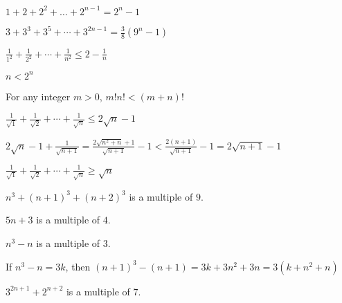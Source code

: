 \begin{multicols}{2}
\begin{ex}
$1 + 2 + 2^{2} + \dots  + 2^{n-1} = 2^{n} - 1$
\end{ex}

\begin{ex}
$3 + 3^3 + 3^5 + \cdots + 3^{2n-1} = \frac{3}{8} (9^n-1)$
\end{ex}

\begin{ex}
$\frac{1}{1^2} + \frac{1}{2^2} + \cdots + \frac{1}{n^2} \leq 2 - \frac{1}{n}$
\end{ex}

\begin{ex}
$n < 2^{n}$
\end{ex}

\begin{ex}
For any integer $m > 0$, $m!n! < (m + n)!$
\end{ex}

\begin{ex}
$\frac{1}{\sqrt{1}} + \frac{1}{\sqrt{2}} + \cdots + \frac{1}{\sqrt{n}} \leq 2\sqrt{n}-1$


\begin{sol}
$2\sqrt{n} - 1 + \frac{1}{\sqrt{n+1}} = \frac{2\sqrt{n^2+n}+1}{\sqrt{n+1}} - 1 < \frac{2(n+1)}{\sqrt{n+1}}-1 = 2\sqrt{n+1}-1$
\end{sol}
\end{ex}

\begin{ex}
$\frac{1}{\sqrt{1}} + \frac{1}{\sqrt{2}} + \cdots + \frac{1}{\sqrt{n}} \geq \sqrt{n}$
\end{ex}

\begin{ex}
$n^{3} + (n + 1)^{3} + (n + 2)^{3}$ is a multiple of $9$.
\end{ex}

\begin{ex}
$5n + 3$ is a multiple of $4$.
\end{ex}

\begin{ex}
$n^{3} - n$ is a multiple of $3$.

\begin{sol}
If $n^{3} -n = 3k$, then $(n + 1)^{3} - (n + 1) = 3k + 3n^{2} + 3n = 3(k + n^{2} + n)$
\end{sol}
\end{ex}

\begin{ex}
$3^{2n+1} + 2^{n+2}$ is a multiple of $7$.
\end{ex}


\end{multicols}
